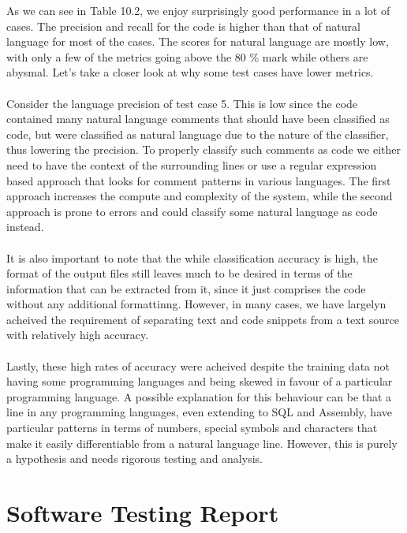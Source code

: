 \documentclass[12pt]{scrreprt}
\begin{document}
As we can see in Table 10.2, we enjoy surprisingly good performance in a lot of cases. The precision and recall for the code is higher than that of natural language for most of the cases. The scores for natural language are mostly low, with only a few of the metrics going above the 80 \% mark while others are abysmal. Let's take a closer look at why some test cases have lower metrics. \\ 
\\ Consider the language precision of test case 5. This is low since the code contained many natural language comments that should have been classified as code, but were classified as natural language due to the nature of the classifier, thus lowering the precision. To properly classify such comments as code we either need to have the context of the surrounding lines or use a regular expression based approach that looks for comment patterns in various languages. The first approach increases the compute and complexity of the system, while the second approach is prone to errors and could classify some natural language as code instead.\\
\\ It is also important to note that the while classification accuracy is high, the format of the output files still leaves much to be desired in terms of the information that can be extracted from it, since it just comprises the code without any additional formattinng. However, in many cases, we have largelyn acheived the requirement of separating text and code snippets from a text source with relatively high accuracy.\\
\\ Lastly, these high rates of accuracy were acheived despite the training data not having some programming languages and being skewed in favour of a particular programming language. A possible explanation for this behaviour can be that a line in any programming languages, even extending to SQL and Assembly, have particular patterns in terms of numbers, special symbols and characters that make it easily differentiable from a natural language line. However, this is purely a hypothesis and needs rigorous testing and analysis.





\section{Software Testing Report}
\end{document}
